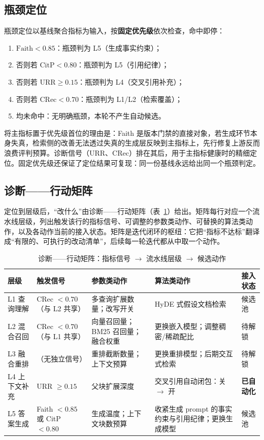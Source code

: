\documentclass[11pt,a4paper,fontset=fandol]{ctexart}
\begin{document}
\subsection{瓶颈定位}
\label{sec:locate}

瓶颈定位以基线聚合指标为输入，按\textbf{固定优先级}依次检查，命中即停：

\begin{enumerate}
  \item $\mathrm{Faith}<0.85$：瓶颈判为 L5（生成事实约束）；
  \item 否则若 $\mathrm{CitP}<0.80$：瓶颈判为 L5（引用纪律）；
  \item 否则若 $\mathrm{URR}\ge 0.15$：瓶颈判为 L4（交叉引用补充）；
  \item 否则若 $\mathrm{CRec}<0.70$：瓶颈判为 L1/L2（检索覆盖）；
  \item 均未命中：无明确瓶颈，本轮不产生自动候选。
\end{enumerate}

将主指标置于优先级首位的理由是：Faith 是版本门禁的直接对象，若生成环节本身失真，检索侧的改善无法透过失真的生成层反映到主指标上，先行修复上游反而浪费评判预算。诊断信号（URR、CRec）排在其后，用于主指标健康时的精细定位。固定优先级还保证了定位结果可复现：同一份基线永远给出同一个瓶颈判定。

\subsection{诊断——行动矩阵}
\label{sec:matrix}

定位到层级后，``改什么''由诊断——行动矩阵（表~\ref{tab:matrix}）给出。矩阵每行对应一个流水线层级，列出触发该行的指标信号、可调整的参数类动作、可替换的算法类动作，以及各动作当前的接入状态。矩阵是迭代闭环的枢纽：它把``指标不达标''翻译成``有限的、可执行的改动清单''，后续每一轮迭代都从中取一个动作。

\begin{table}[!htbp]
\centering\footnotesize
\caption{诊断——行动矩阵：指标信号 $\to$ 流水线层级 $\to$ 候选动作}\label{tab:matrix}
\begin{tabularx}{\textwidth}{@{}llXXl@{}}
\toprule
层级 & 触发信号 & 参数类动作 & 算法类动作 & 接入状态 \\
\midrule
L1 查询理解 & CRec $<0.70$（与 L2 共享） & 多查询扩展数量；改写开关 & HyDE 式假设文档检索\cite{hyde} & 候选池 \\
L2 混合召回 & CRec $<0.70$（与 L1 共享） & 向量召回量；BM25 召回量；融合权重 & 更换嵌入模型；调整稠密/稀疏配比 & 待解锁 \\
L3 融合重排 & （无独立信号） & 重排截断数量；上下文预算 & 更换重排模型\cite{monobert}；后期交互式检索\cite{colbert} & 待解锁 \\
L4 上下文补充 & URR $\ge 0.15$ & 父块扩展深度 & 交叉引用自动闭包：关 $\to$ 开 & \textbf{已自动化} \\
L5 答案生成 & Faith $<0.85$ 或 CitP $<0.80$ & 生成温度；上下文块数预算 & 收紧生成 prompt 的事实约束与引用纪律；更换生成模型 & 候选池 \\
\bottomrule
\end{tabularx}
\end{table}
\end{document}
